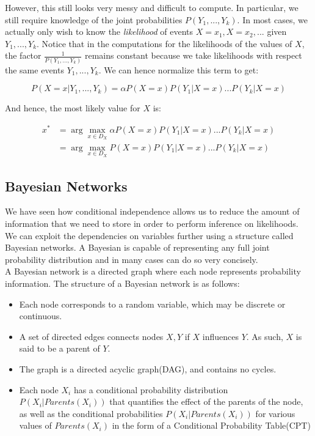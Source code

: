 \documentclass[12pt]{article}
\begin{document}
However, this still looks very messy and difficult to compute. In particular, we still require knowledge of the joint probabilities $P(Y_1,...,Y_k)$. In most cases, we actually only wish to know the \textit{likelihood} of events $X = x_1, X = x_2,...$ given $Y_1,...,Y_k$. Notice that in the computations for the likelihoods of the values of $X$, the factor $\frac{1}{P(Y_1,...,Y_k)} $ remains constant because we take likelihoods with respect the same events $Y_1,...,Y_k$. We can hence normalize this term to get:

\begin{equation*}
P(X = x | Y_1,...,Y_k) = \alpha P(X = x)P(Y_1| X = x)...P(Y_k| X = x)
\end{equation*}

And hence, the most likely value for $X$ is:

\begin{equation*}
\begin{aligned}
x^* &= \arg\max_{x \in D_X} \alpha P(X = x)P(Y_1| X = x)...P(Y_k| X = x)\\ 
&= \arg\max_{x \in D_X} P(X = x)P(Y_1| X = x)...P(Y_k| X = x)
\end{aligned}
\end{equation*}

\subsection{Bayesian Networks}

We have seen how conditional independence allows us to reduce the amount of information that we need to store in order to perform inference on likelihoods. We can exploit the dependencies on variables further using a structure called Bayesian networks. A Bayesian is capable of representing any full joint probability distribution and in many cases can do so very concisely.\\

A Bayesian network is a directed graph where each node represents probability information. The structure of a Bayesian network is as follows:

\begin{itemize}
\item Each node corresponds to a random variable, which may be discrete or continuous.
\item A set of directed edges connects nodes $X, Y$ if $X$ influences $Y$. As such, $X$ is said to be a parent of $Y$.
\item The graph is a directed acyclic graph(DAG), and contains no cycles.
\item Each node $X_i$ has a conditional probability distribution $P(X_i | Parents(X_i))$ that quantifies the effect of the parents of the node, as well as the conditional probabilities $P(X_i | Parents(X_i))$ for various values of $Parents(X_i)$ in the form of a Conditional Probability Table(CPT)
\end{itemize}
\end{document}
